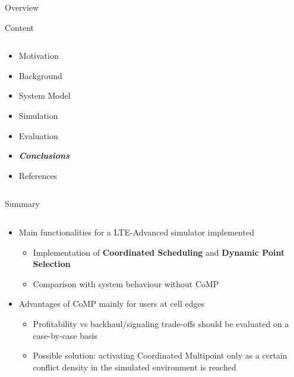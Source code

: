 \documentclass[xcolor={cmyk}]{beamer}
\begin{document}
 
\begin{frame}{Overview}
	\begin{block}{Content}
		\begin{columns}
			\begin{column}{.9\textwidth}
				\begin{itemize}
					\item Motivation
					\item Background
					\item System Model
					\item Simulation
					\item Evaluation
					\item \textbf{\emph{Conclusions}}
					\item References
				\end{itemize}
			\end{column}
		\end{columns}
	\end{block}
\end{frame}

\begin{frame}{Summary}
	\begin{block}{}
		\begin{columns}
			\begin{column}{.9\textwidth}
				\begin{itemize}
					\item Main functionalities for a LTE-Advanced simulator implemented
					\begin{itemize}
						\item Implementation of \textbf{Coordinated Scheduling} and \textbf{Dynamic Point Selection}
						\item Comparison with system behaviour without CoMP
					\end{itemize}
					\item Advantages of CoMP mainly for users at cell edges
					\begin{itemize}
						\item Profitability vs backhaul/signaling trade-offs should be evaluated on a case-by-case basis
						\item Possible solution: activating Coordinated Multipoint only as a certain conflict density in the simulated environment is reached
					\end{itemize}
				\end{itemize}
			\end{column}
		\end{columns}
	\end{block}
\end{frame}
\end{document}
